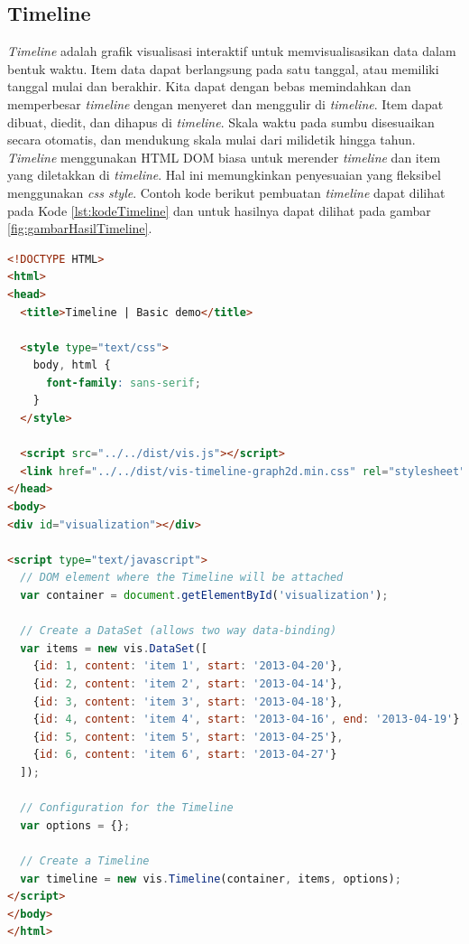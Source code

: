 \subsection{Timeline}
\textit{Timeline} adalah grafik visualisasi interaktif untuk memvisualisasikan data dalam bentuk waktu. Item data dapat berlangsung pada satu tanggal, atau memiliki tanggal mulai dan berakhir. Kita dapat dengan bebas memindahkan dan memperbesar \textit{timeline} dengan menyeret dan menggulir di \textit{timeline}. Item dapat dibuat, diedit, dan dihapus di \textit{timeline}. Skala waktu pada sumbu disesuaikan secara otomatis, dan mendukung skala mulai dari milidetik hingga tahun. \textit{Timeline} menggunakan HTML DOM biasa untuk merender \textit{timeline} dan item yang diletakkan di \textit{timeline}. Hal ini memungkinkan penyesuaian yang fleksibel menggunakan \textit{css style}. Contoh kode berikut pembuatan \textit{timeline} dapat dilihat pada Kode \ref{lst:kodeTimeline} dan untuk hasilnya dapat dilihat pada gambar \ref{fig:gambarHasilTimeline}.

\begin{lstlisting}[language=HTML, caption=Contoh kode untuk membuat \textit{timeline} menggunakan \textit{vis.js}\label{lst:kodeTimeline}]
<!DOCTYPE HTML>
<html>
<head>
  <title>Timeline | Basic demo</title>

  <style type="text/css">
    body, html {
      font-family: sans-serif;
    }
  </style>

  <script src="../../dist/vis.js"></script>
  <link href="../../dist/vis-timeline-graph2d.min.css" rel="stylesheet" type="text/css" />
</head>
<body>
<div id="visualization"></div>

<script type="text/javascript">
  // DOM element where the Timeline will be attached
  var container = document.getElementById('visualization');

  // Create a DataSet (allows two way data-binding)
  var items = new vis.DataSet([
    {id: 1, content: 'item 1', start: '2013-04-20'},
    {id: 2, content: 'item 2', start: '2013-04-14'},
    {id: 3, content: 'item 3', start: '2013-04-18'},
    {id: 4, content: 'item 4', start: '2013-04-16', end: '2013-04-19'},
    {id: 5, content: 'item 5', start: '2013-04-25'},
    {id: 6, content: 'item 6', start: '2013-04-27'}
  ]);

  // Configuration for the Timeline
  var options = {};

  // Create a Timeline
  var timeline = new vis.Timeline(container, items, options);
</script>
</body>
</html>
\end{lstlisting}

